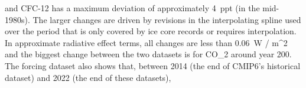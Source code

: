 and CFC-12 has a maximum deviation of approximately 4~ppt (in the mid-1980s).
The larger changes are driven by revisions in the interpolating spline used over the period that is only covered by ice core records or requires interpolation.
In approximate radiative effect terms, all changes are less than 0.06~W / m^2
and the biggest change between the two datasets is for CO_2 around year 200.
The forcing dataset also shows that, between 2014 (the end of CMIP6's historical dataset)
and 2022 (the end of these datasets),
